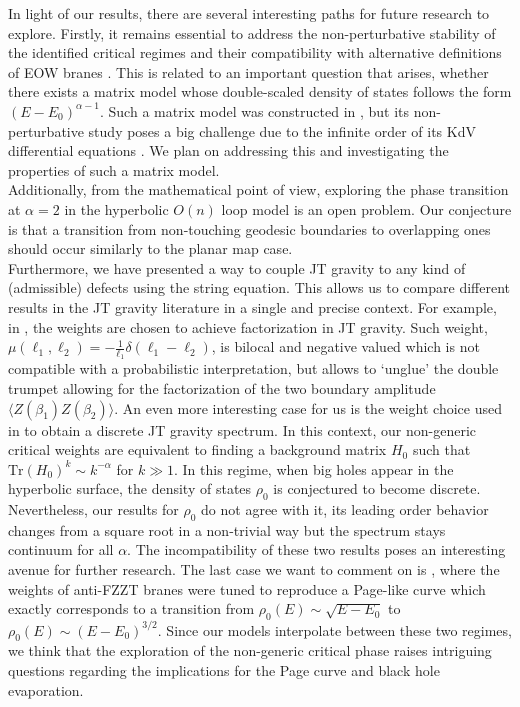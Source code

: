 \documentclass[a4paper,11pt]{article}
\begin{document}
In light of our results, there are several interesting paths for future research to explore. 
Firstly, it remains essential to address the non-perturbative stability of the identified critical regimes and their compatibility with alternative definitions of EOW branes \cite{Johnson:2021tnl}.
This is related to an important question that arises, whether there exists a matrix model whose double-scaled density of states follows the form $(E-E_0)^{\alpha-1}$. Such a matrix model was constructed in \cite{Ambjorn:2016lkl}, but its non-perturbative study poses a big challenge due to the infinite order of its KdV differential equations \cite{Ambjorn:2017ibv}. We plan on addressing this  and investigating the properties of such a matrix model.
\\
Additionally, from the mathematical point of view, exploring the phase transition at $\alpha=2$ in the hyperbolic $O(n)$ loop model is an open problem. Our conjecture is that a transition from non-touching geodesic boundaries to overlapping ones should occur similarly to the planar map case.\\
Furthermore, we have presented a way to couple JT gravity to any kind of (admissible) defects using the string equation. This allows us to compare different results in the JT gravity literature in a single and precise context. For example, in \cite{Blommaert:2021fob}, the weights are chosen to achieve factorization in JT gravity. Such weight, $\mu(\ell_1,\ell_2)=-\frac{1}{\ell_1}\delta(\ell_1-\ell_2)$, is bilocal and negative valued which is not compatible with a probabilistic interpretation, but allows to `unglue' the double trumpet allowing for the factorization of the two boundary amplitude $\langle Z(\beta_1) Z(\beta_2)\rangle$. An even more interesting case for us is the weight choice used in \cite{Blommaert:2021gha} to obtain a discrete JT gravity spectrum. In this context, our non-generic critical weights are equivalent to finding a background matrix $H_0$ such that $\mathrm{Tr}(H_0)^k\sim k^{-\alpha}$ for $k\gg 1$. In this regime, when big holes appear in the hyperbolic surface, the density of states $\rho_0$ is conjectured to become discrete. Nevertheless, our results for $\rho_0$ do not agree with it, its leading order behavior changes from a square root in a non-trivial way but the spectrum stays continuum for all $\alpha$. The incompatibility of these two results poses an interesting avenue for further research. The last case we want to comment on is \cite{Okuyama:2021Page}, where the weights of anti-FZZT branes were tuned to reproduce a Page-like curve which exactly corresponds to a transition from $\rho_0(E)\sim\sqrt{E-E_0}$ to $\rho_0(E)\sim (E-E_0)^{3/2}$. Since our models interpolate between these two regimes, we think that the exploration of the non-generic critical phase raises intriguing questions regarding the implications for the Page curve and black hole evaporation.\\
\end{document}
